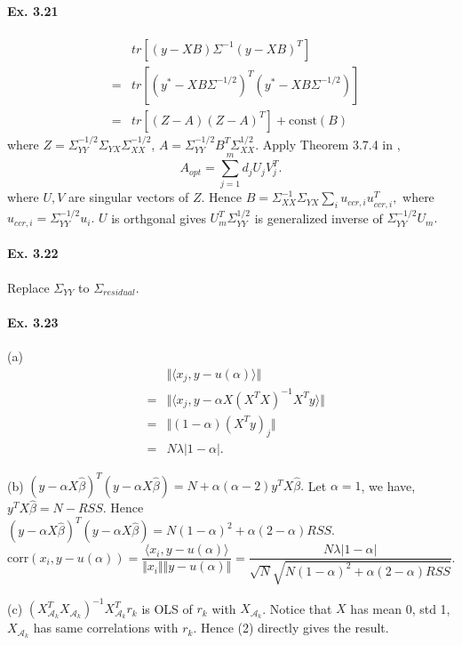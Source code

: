 \paragraph*{Ex. 3.21}
\begin{eqnarray*}
    & & tr\left[(y-XB)\Sigma^{-1}(y-XB)^{T}\right]\\
    &=& tr\left[(y^{*}-XB\Sigma^{-1/2})^{T}(y^{*}-XB\Sigma^{-1/2})\right]\\
    &=& tr\left[(Z-A)(Z-A)^T\right] + \mbox{const}(B)
\end{eqnarray*}
where $Z=\Sigma_{YY}^{-1/2}\Sigma_{YX}\Sigma_{XX}^{-1/2}$, $A=\Sigma_{YY}^{-1/2}B^{T}\Sigma_{XX}^{1/2}$. Apply Theorem 3.7.4 in \cite{Brillinger},
$$A_{opt} = \sum_{j=1}^m d_{j} U_{j} V_{j}^T.$$
where $U, V$ are singular vectors of $Z$. Hence $B=\Sigma_{XX}^{-1}\Sigma_{YX}\sum_{i} u_{ccr,i} u_{ccr,i}^T,$ where
$u_{ccr,i} = \Sigma_{YY}^{-1/2}u_{i}.$ $U$ is orthgonal gives $U_{m}^T \Sigma_{YY}^{1/2}$ is generalized inverse of $\Sigma_{YY}^{-1/2}U_{m}.$

\paragraph*{Ex. 3.22}
Replace $\Sigma_{YY}$ to $\Sigma_{residual}$.

\paragraph*{Ex. 3.23}

(a)
\begin{eqnarray*}
    & & \Vert \langle x_j, y - u(\alpha) \rangle \Vert\\
    &=& \Vert \langle x_j, y - \alpha X(X^TX)^{-1}X^Ty \rangle \Vert\\
    &=& \Vert (1 - \alpha)(X^Ty)_{j}\Vert\\
    &=& N\lambda|1 - \alpha|.
\end{eqnarray*}

(b) $(y-\alpha X\hat{\beta})^T(y-\alpha X\hat{\beta}) = N + \alpha (\alpha - 2) y^T X \hat{\beta}.$ Let $\alpha = 1$, we have, $y^T X \hat{\beta} = N - RSS.$ Hence
$(y-\alpha X\hat{\beta})^T(y-\alpha X\hat{\beta}) =N(1-\alpha)^2 + \alpha(2 - \alpha)RSS.$
$$\mbox{corr}(x_{i}, y-u(\alpha))=\frac{\langle x_{i}, y-u(\alpha)\rangle}{\Vert x_{i}\Vert \Vert y-u(\alpha)\Vert}=\frac{N\lambda|1 - \alpha|}{\sqrt{N}\sqrt{N(1-\alpha)^2 + \alpha(2 - \alpha)RSS}}.$$

(c) $(X_{\mathcal{A}_{k}}^T X_{\mathcal{A}_{k}})^{-1}X_{\mathcal{A}_{k}}^T r_{k}$ is OLS of $r_{k}$ with $X_{\mathcal{A}_{k}}$. Notice that $X$ has mean 0, std 1, $X_{\mathcal{A}_{k}}$ has same correlations with $r_{k}$. Hence (2) directly gives the result.

